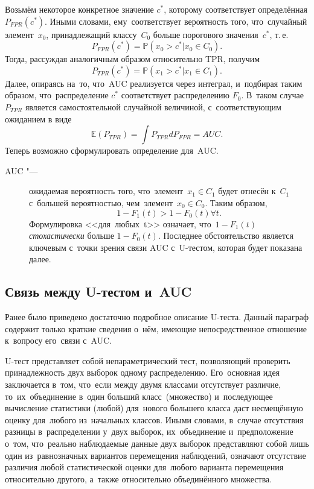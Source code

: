 \documentclass[]{scrreprt}
\begin{document}
Возьмём некоторое конкретное значение $c^{*}$, которому соответствует определённая $P_{FPR}(c^{*})$. Иными словами, ему~соответствует вероятность того, что~случайный элемент~$x_{0}$, принадлежащий классу~$C_{0}$ больше порогового значения~$c^{*}$, т.\,е.
\begin{equation}\label{eq:AUC-computation-3}
P_{FPR}(c^{*}) = \mathbb{P}(x_{0}>c^{*}|x_{0} \in C_{0}).
\end{equation}
Тогда, рассуждая аналогичным образом относительно TPR, получим
\begin{equation}\label{eq:AUC-computation-4}
P_{TPR}(c^{*}) = \mathbb{P}(x_{1}>c^{*}|x_{1} \in C_{1}).
\end{equation}
Далее, опираясь на~то, что~AUC реализуется через интеграл, и~подбирая  таким образом, что~распределение $c^{*}$ соответствует распределению $F_{0}$. В~таком случае $P_{TPR}$ является самостоятельной случайной величиной, с~соответствующим ожиданием в виде
\begin{equation}\label{eq:AUC-computation-integral}
\mathbb{E}(P_{TPR}) = \int P_{TPR} d P_{FPR} = AUC.
\end{equation}
Теперь возможно сформулировать определение для~AUC.
\begin{description}
	\item[AUC "---] ожидаемая вероятность того, что~элемент~$x_{1} \in C_{1}$ будет отнесён к~$C_{1}$ с~большей вероятностью, чем~элемент~$x_{0} \in C_{0}$. Таким образом,
	\begin{equation}\label{eq:AUC-definition}
	1-F_{1}(t)>1-F_{0}(t) \forall t.
	\end{equation}
	Формулировка <<для~любых~t>> означает, что~$1-F_{1}(t)$ \emph{стохастически} больше $1-F_{0}(t)$. Последнее обстоятельство является ключевым с~точки зрения связи AUC с~U-тестом, которая будет показана далее.
\end{description}
%
\subsection{Связь между U-тестом и~AUC}\label{U-test&AUC-relation}
Ранее было приведено достаточно подробное описание U-теста. Данный параграф содержит только краткие сведения о~нём, имеющие непосредственное отношение к~вопросу его~связи с~AUC.

U-тест представляет собой непараметрический тест, позволяющий проверить принадлежность двух выборок одному распределению. Его~основная идея заключается в~том, что~если между двумя классами отсутствует различие, то~их~объединение в~один больший класс~(множество) и~последующее вычисление статистики (любой) для~нового большего класса даст несмещённую оценку для~любого из~начальных классов. Иными словами, в~случае отсутствия разницы в~распределении у~двух выборок, их~объединение и~предположение о~том, что~реально наблюдаемые данные двух выборок представляют собой лишь один из~равнозначных вариантов перемещения наблюдений, означают отсутствие различия любой статистической оценки для~любого варианта перемещения относительно другого, а~также относительно объединённого множества.
\end{document}
